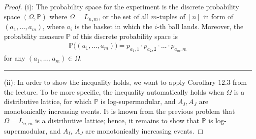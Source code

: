 \begin{proof}
  (i): The probability space for the experiment is the discrete probability space $(\Omega, \mathbb{P})$ where $\Omega = L_{n,m}$, or the set of all $m$-tuples of $[n]$ in form of $(a_{1},\ldots,a_{m})$, where $a_{i}$ is the basket in which the $i$-th ball lands. Moreover, the probability measure $\mathbb{P}$ of this discrete probability space is 
  \begin{align*}
    \mathbb{P}\Big( (a_{1},\ldots,a_{m}) \Big) = p_{a_{1},1} \cdot p_{a_{2},2} \cdot \ldots \cdot p_{a_{m},m}
  \end{align*}
  for any $(a_{1},\ldots,a_{m}) \in \Omega$.
  \vspace{5pt}
  \hrule
  (ii): In order to show the inequality holds, we want to apply Corollary $12.3$ from the lecture. To be more specific, the inequality automatically holds when $\Omega$ is a distributive lattice, for which $\mathbb{P}$ is log-supermodular, and $A_{I}, A_{J}$ are monotonically increasing events. It is known from the previous problem that $\Omega = L_{n,m}$ is a distributive lattice; hence, it remains to show that $\mathbb{P}$ is log-supermodular, and $A_{I}$, $A_{J}$ are monotonically increasing events.


\end{proof}
